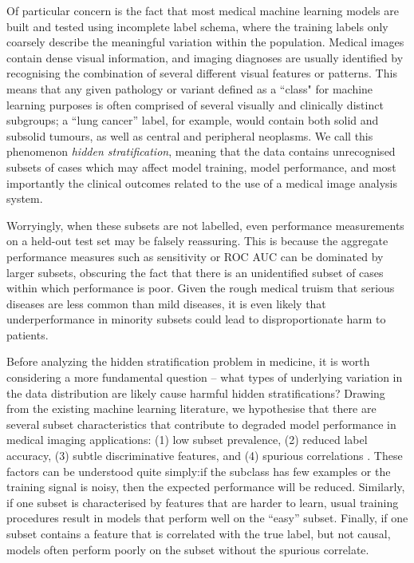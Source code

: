 \documentclass{article}
\begin{document}
Of particular concern is the fact that most medical machine learning models are built and tested using incomplete label schema, where the training labels only coarsely describe the meaningful variation within the population. 
Medical images contain dense visual information, and imaging diagnoses are usually identified by recognising the combination of several different visual features or patterns. 
This means that any given pathology or variant defined as a ``class" for machine learning purposes is often comprised of several visually and clinically distinct subgroups; a ``lung cancer'' label, for example, would contain both solid and subsolid tumours, as well as central and peripheral neoplasms. 
We call this phenomenon \textit{hidden stratification}, meaning that the data contains unrecognised subsets of cases which may affect model training, model performance, and most importantly the clinical outcomes related to the use of a medical image analysis system.  

Worryingly, when these subsets are not labelled, even performance measurements on a held-out test set may be falsely reassuring. 
This is because the aggregate performance measures such as sensitivity or ROC AUC can be dominated by larger subsets, obscuring the fact that there is an unidentified subset of cases within which performance is poor. 
Given the rough medical truism that serious diseases are less common than mild diseases, it is even likely that underperformance in minority subsets could lead to disproportionate harm to patients.

Before analyzing the hidden stratification problem in medicine, it is worth considering a more fundamental question -- what types of underlying variation in the data distribution are likely cause harmful hidden stratifications?  
Drawing from the existing machine learning literature, we hypothesise that there are several subset characteristics that contribute to degraded model performance in medical imaging applications: (1) low subset prevalence, (2) reduced label accuracy, (3) subtle discriminative features, and (4) spurious correlations \citep{Selbst2017-gz}.
 These factors can be understood quite simply:if the subclass has few examples or the training signal is noisy, then the expected performance will be reduced. 
 Similarly, if one subset is characterised by features that are harder to learn, usual training procedures result in models that perform well on
the ``easy'' subset.  
Finally, if one subset contains a feature that is correlated with the true label, but not causal, models often perform poorly on the subset without the spurious correlate.
\end{document}
